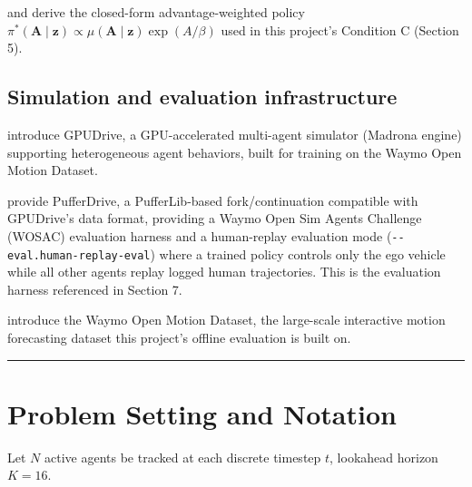 \documentclass[11pt]{article}
\begin{document}
\citet{peng2019awr} and \citet{nair2020awac} derive the closed-form advantage-weighted policy \(\pi^*(\mathbf{A}\mid\mathbf{z}) \propto \mu(\mathbf{A}\mid\mathbf{z})\exp(A/\beta)\) used in this project's Condition C (Section 5). 

\hypertarget{simulation-and-evaluation-infrastructure}{%
\subsection{Simulation and evaluation infrastructure}\label{simulation-and-evaluation-infrastructure}}

\citet{kazemkhani2025gpudrive} introduce GPUDrive, a GPU-accelerated multi-agent simulator (Madrona engine) supporting heterogeneous agent behaviors, built for training on the Waymo Open Motion Dataset.

\citet{emergelab_pufferdrive} provide PufferDrive, a PufferLib-based fork/continuation compatible with GPUDrive's data format, providing a Waymo Open Sim Agents Challenge (WOSAC) evaluation harness and a human-replay evaluation mode (\texttt{-\/-eval.human-replay-eval}) where a trained policy controls only the ego vehicle while all other agents replay logged human trajectories. This is the evaluation harness referenced in Section 7.

\citet{ettinger2021waymo} introduce the Waymo Open Motion Dataset, the large-scale interactive motion forecasting dataset this project's offline evaluation is built on.

\begin{center}\rule{0.5\linewidth}{0.5pt}\end{center}

\hypertarget{problem-setting-and-notation}{%
\section{Problem Setting and Notation}\label{problem-setting-and-notation}}

Let \(N\) active agents be tracked at each discrete timestep \(t\), lookahead horizon \(K=16\).
\end{document}
